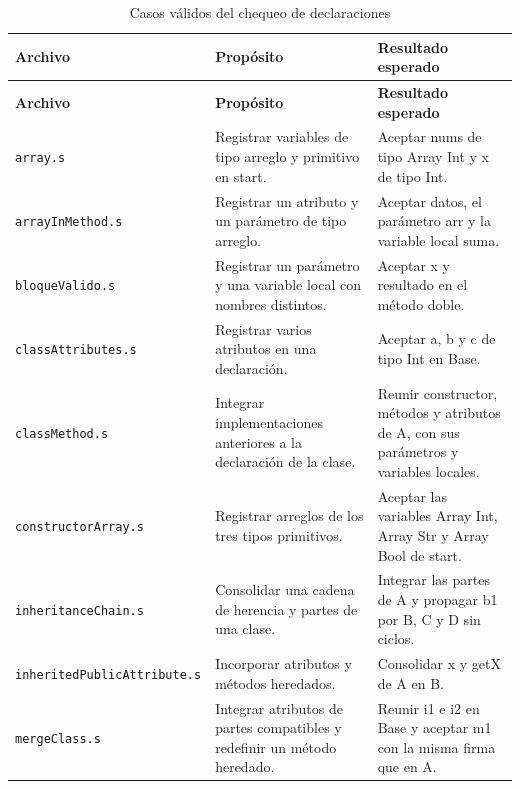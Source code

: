 \begingroup
\small
\renewcommand{\arraystretch}{1.2}
\setlength{\tabcolsep}{5pt}
\setlength{\LTleft}{0pt}
\setlength{\LTright}{0pt plus 1fill}
\begin{longtable}{|
>{\raggedright\arraybackslash}p{}|
>{\raggedright\arraybackslash}p{}|
>{\raggedright\arraybackslash}p{}|}
\caption{Casos válidos del chequeo de declaraciones}\label{tab:declaraciones-validos}\\
\hline
\textbf{Archivo} & \textbf{Propósito} & \textbf{Resultado esperado} \\ \hline
\endfirsthead
\hline
\textbf{Archivo} & \textbf{Propósito} & \textbf{Resultado esperado} \\ \hline
\endhead
\texttt{array\allowbreak .s} & Registrar variables de tipo arreglo y primitivo en start. & Aceptar nums de tipo Array Int y x de tipo Int. \\ \hline
\texttt{arrayInMethod\allowbreak .s} & Registrar un atributo y un parámetro de tipo arreglo. & Aceptar datos, el parámetro arr y la variable local suma. \\ \hline
\texttt{bloqueValido\allowbreak .s} & Registrar un parámetro y una variable local con nombres distintos. & Aceptar x y resultado en el método doble. \\ \hline
\texttt{classAttributes\allowbreak .s} & Registrar varios atributos en una declaración. & Aceptar a, b y c de tipo Int en Base. \\ \hline
\texttt{classMethod\allowbreak .s} & Integrar implementaciones anteriores a la declaración de la clase. & Reunir constructor, métodos y atributos de A, con sus parámetros y variables locales. \\ \hline
\texttt{constructorArray\allowbreak .s} & Registrar arreglos de los tres tipos primitivos. & Aceptar las variables Array Int, Array Str y Array Bool de start. \\ \hline
\texttt{inheritanceChain\allowbreak .s} & Consolidar una cadena de herencia y partes de una clase. & Integrar las partes de A y propagar b1 por B, C y D sin ciclos. \\ \hline
\texttt{inheritedPublicAttribute\allowbreak .s} & Incorporar atributos y métodos heredados. & Consolidar x y getX de A en B. \\ \hline
\texttt{mergeClass\allowbreak .s} & Integrar atributos de partes compatibles y redefinir un método heredado. & Reunir i1 e i2 en Base y aceptar m1 con la misma firma que en A. \\ \hline

\end{longtable}
